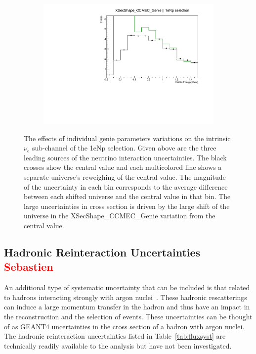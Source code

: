 \documentclass[a4paper]{article}
\begin{document}
\begin{figure}[ht]
\begin{center}
    \begin{subfigure}[b]{0.33\textwidth}
    \centering
    \includegraphics[width=1.00\textwidth]{systvariations/Variation_nue_reco_e_genietune_run1_XSecShape_CCMEC_Genie_nu_uBooNE_nue_intrinsic.pdf}
    \end{subfigure}
\caption{\label{fig:geniesystvars} The effects of individual genie parameters variations on the intrinsic $\nu_e$ sub-channel of the 1eNp selection. Given above are the three leading sources of the neutrino interaction uncertainties. The black crosses show the central value and each multicolored line shows a separate universe's reweighing of the central value. The magnitude of the  uncertainty in each bin corresponds to the average difference between each shifted universe and the central value in that bin. The large uncertainties in cross section is driven by the large shift of the universe in the XSecShape\_CCMEC\_Genie variation from the central value.}
\end{center}
\end{figure}

\subsection{Hadronic Reinteraction Uncertainties \textcolor{red}{Sebastien}}
An additional type of systematic uncertainty that can be included is that related to hadrons interacting strongly with argon nuclei~\cite{bib:reintslides}. These hadronic rescatterings can induce a large momentum transfer in the hadron and thus have an impact in the reconstruction and the selection of events. These uncertainties can be thought of as GEANT4 uncertainties in the cross section of a hadron with argon nuclei. The hadronic reinteraction uncertainties listed in Table~\ref{tab:fluxsyst} are technically readily available to the analysis but have not been investigated.
\end{document}
